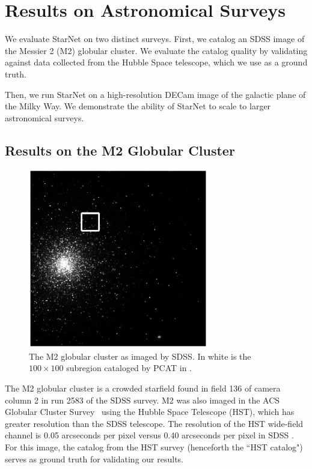 \section{Results on Astronomical Surveys}

We evaluate StarNet on two distinct surveys. First, we catalog an SDSS image of the Messier 2 (M2) globular cluster. 
We evaluate the catalog quality by validating against data collected from 
the Hubble Space telescope, which we use as a ground truth. 

Then, we run StarNet on a high-resolution DECam image of the galactic plane of the Milky Way. 
We demonstrate the ability of StarNet to scale to larger astronomical surveys.

\subsection{Results on the M2 Globular Cluster}
\label{sec:results_on_m2}

\begin{figure}[tb]
    \centering
    \includegraphics[width=0.7\textwidth]{figures_vg/m2_results/m2_regions.eps}
    \caption{The M2 globular cluster as imaged by SDSS. In white is the $100 \times 100$ subregion 
    cataloged by PCAT in \cite{Feder_2019}. }
    \label{fig:m2_region}
\end{figure}

The M2 globular cluster is a crowded starfield found in field 136 of camera column 2 in run 2583 of the SDSS survey. 
M2 was also imaged in the ACS Globular Cluster Survey~\citep{Sarajedini_2007}
using the Hubble Space Telescope (HST),
which has greater resolution than the SDSS telescope.
The resolution of the HST wide-field channel is 0.05 arcseconds per pixel versus
0.40 arcseconds per pixel in SDSS \citep{hubble_about, sdss_about}.
For this image, the catalog from the HST survey (henceforth the ``HST catalog")
serves as ground truth for validating our results.

